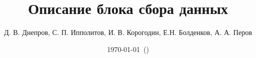 


\title{Описание блока сбора данных}
\author{Д. В. Днепров, С. П. Ипполитов, И. В. Корогодин, Е.Н. Болденков, А. А. Перов}
\confidential{}
\date{\today~(\currenttime)}
\renewcommand{\familydefault}{\sfdefault}





\maketitle

\newpage
\tableofcontents
\newpage











